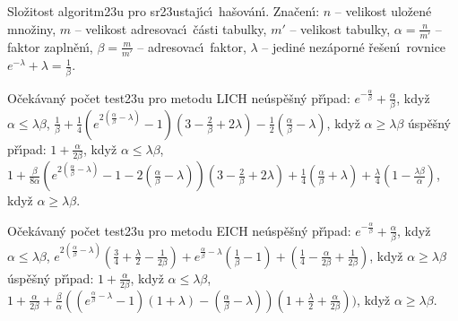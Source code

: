 \flushpar Slo\v zitost algoritm\accent23u pro sr\accent23ustaj\'\i c\'\i\ ha\v sov\'an\'\i .\newline 
Zna\v cen\'\i : $n$ -- velikost ulo\v zen\'e mno\v ziny,\newline 
$m$ -- velikost adresovac\'\i\ \v c\'asti tabulky,\newline 
$m'$ -- velikost tabulky,\newline 
$\alpha =\frac n{m'}$ -- faktor zapln\v en\'\i ,\newline 
$\beta =\frac m{m'}$ -- adresovac\'\i\ faktor,\newline 
$\lambda$ -- jedin\'e nez\'aporn\'e \v re\v sen\'\i\ rovnice $e^{
-\lambda}+\lambda =\frac 1{\beta}$.
\medskip

\flushpar O\v cek\'avan\'y po\v cet test\accent23u pro metodu LICH\newline 
ne\'usp\v e\v sn\'y p\v r\'\i pad:\newline 
\phantom{---}$e^{-\frac {\alpha}{\beta}}+\frac {
\alpha}{\beta}$, kdy\v z  $\alpha\le\lambda\beta$, \newline 
\phantom{---}$\frac 1{\beta}+\frac 14\left(e^{2\left(\frac {\alpha}{\beta}-\lambda \right)}-1\right)
\left(3-\frac 2{\beta}+2\lambda \right)-\frac 12\left(\frac {\alpha}{\beta}-\lambda 
\right)$, kdy\v z $\alpha\ge\lambda\beta$\newline 
\'usp\v e\v sn\'y p\v r\'\i pad:\newline 
\phantom{---}$1+\frac {\alpha}{2\beta}$, kdy\v z $
\alpha\le\lambda\beta$, \newline 
\phantom{---}$1+\frac {\beta}{8\alpha}\left(e^{2\left(\frac {\alpha}{\beta}-\lambda \right)}-1
-2\left(\frac {\alpha}{\beta}-\lambda \right)\right)\left(3-\frac 2{\beta}+2\lambda \right)+\frac 
14\left(\frac {\alpha}{\beta}+\lambda \right)+\frac {\lambda}4\left(1-\frac {\lambda
\beta}{\alpha}\right)$, 
kdy\v z $\alpha\ge\lambda\beta$.
\medskip

\flushpar O\v cek\'avan\'y po\v cet test\accent23u pro metodu EICH\newline 
ne\'usp\v e\v sn\'y p\v r\'\i pad:\newline
\phantom{---} $e^{-\frac {\alpha}{\beta}}+\frac {
\alpha}{\beta}$, kdy\v z  $\alpha\le\lambda\beta$, \newline 
\phantom{---}$e^{2\left(\frac {\alpha}{\beta}-\lambda \right)}\left(\frac 34+\frac {\lambda}2-\frac 
1{2\beta}\right)+e^{\frac {\alpha}{\beta}-\lambda}\left(\frac 1{\beta}-1\right)+\left(\frac 
14-\frac {\alpha}{2\beta}+\frac 1{2\beta}\right)$, kdy\v z $\alpha\ge\lambda
\beta$\newline 
\'usp\v e\v sn\'y p\v r\'\i pad:\newline 
\phantom{---}$1+\frac {\alpha}{2\beta}$, kdy\v z $
\alpha\le\lambda\beta$, \newline 
\phantom{---}$1+\frac {\alpha}{2\beta}+\frac {\beta}{\alpha}\left(\left(e^{\frac {\alpha}{
\beta}-\lambda}-1\right)\left(1+\lambda \right)-\left(\frac {\alpha}{\beta}-\lambda \right)\right)\left(
1+\frac {\lambda}2+\frac {\alpha}{2\beta}\right))$, kdy\v z $\alpha\ge\lambda
\beta$.
\medskip

